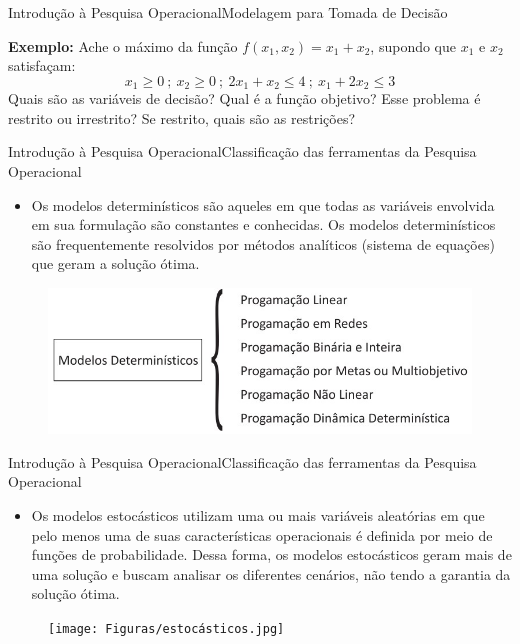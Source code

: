 \documentclass[t]{beamer}
\begin{document}

\begin{ftst}{Introdução à Pesquisa Operacional}{Modelagem para Tomada de Decisão}

\textbf{Exemplo:} Ache o máximo da função $f(x_1,x_2) = x_1 + x_2$, supondo que $x_1$ e $x_2$ satisfaçam:
\begin{equation*}
    x_1 \ge 0 \ ; \ x_2 \ge 0 \ ; \ 2x_1 + x_2 \le 4 \ ; \ x_1 + 2x_2 \le 3
\end{equation*}
\vone
Quais são as variáveis de decisão? 
\vone
Qual é a função objetivo? 
\vone
Esse problema é restrito ou irrestrito? 
\vone
Se restrito, quais são as restrições?

\end{ftst}


\begin{ftst}{Introdução à Pesquisa Operacional}{Classificação das ferramentas da Pesquisa Operacional}
\begin{itemize}
    \item Os modelos determinísticos são aqueles em que todas as variáveis envolvida em sua formulação são constantes e conhecidas. Os modelos determinísticos são frequentemente resolvidos por métodos analíticos (sistema de equações) que geram a solução ótima.
\end{itemize}

\begin{figure}
    \centering
    \includegraphics[scale=0.5]{Figuras/deterministicos.jpg}
\end{figure}
\end{ftst}


\begin{ftst}{Introdução à Pesquisa Operacional}{Classificação das ferramentas da Pesquisa Operacional}
\begin{itemize}
    \item Os modelos estocásticos utilizam uma ou mais variáveis aleatórias em que pelo menos uma de suas características operacionais é definida por meio de funções de probabilidade. Dessa forma, os modelos estocásticos geram mais de uma solução e buscam analisar os diferentes cenários, não tendo a garantia da solução ótima.
\end{itemize}

\begin{figure}
    \centering
    \texttt{[image: Figuras/estocásticos.jpg]}
\end{figure}
\end{ftst}
\end{document}
